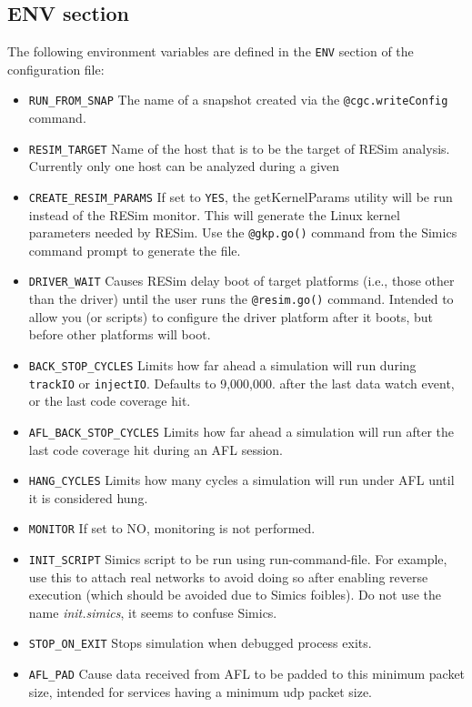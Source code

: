\documentclass[titlepage]{article}
\begin{document}
\subsection{ENV section}
\label{env}
The following environment variables are defined in the {\tt ENV} section of the configuration file:
\begin{itemize}
\item {\tt RUN\_FROM\_SNAP} The name of a snapshot created via the {\tt @cgc.writeConfig} command.
\item {\tt RESIM\_TARGET} Name of the host that is to be the target of RESim analysis.  Currently only one host can be analyzed during a given
\item {\tt CREATE\_RESIM\_PARAMS} If set to {\tt YES}, the getKernelParams utility will be run instead of the RESim monitor.  This will
generate the Linux kernel parameters needed by RESim.  Use the {\tt @gkp.go()} command from the Simics command prompt to generate the file.
\item {\tt DRIVER\_WAIT} Causes RESim delay boot of target platforms (i.e., those other than the driver) until the 
user runs the {\tt @resim.go()} command.  Intended to allow you (or scripts)
to configure the driver platform after it boots, but before other platforms will boot.
\item {\tt BACK\_STOP\_CYCLES} Limits how far ahead a simulation will run during {\tt trackIO} or {\tt injectIO}. Defaults to 9,000,000. 
after the last data watch event, or the last code coverage hit.
\item {\tt AFL\_BACK\_STOP\_CYCLES} Limits how far ahead a simulation will run after the last code coverage hit during an AFL session.
\item {\tt HANG\_CYCLES} Limits how many cycles a simulation will run under AFL until it is considered hung.
\item {\tt MONITOR} If set to NO, monitoring is not performed.
\item{\tt INIT\_SCRIPT} Simics script to be run using run-command-file.  For example, use this to attach real networks to avoid
doing so after enabling reverse execution (which should be avoided due to Simics foibles).  Do not use the name \textit{init.simics}, it seems
to confuse Simics.
\item {\tt STOP\_ON\_EXIT} Stops simulation when debugged process exits.
\item{\tt AFL\_PAD} Cause data received from AFL to be padded to this minimum packet size, intended for services having a minimum udp packet size.

\end{itemize}
\end{document}
